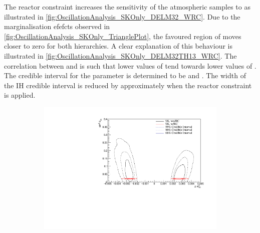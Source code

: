 The reactor constraint increases the sensitivity of the atmospheric samples to \delmsqatm as illustrated in \autoref{fig:OscillationAnalysis_SKOnly_DELM32_WRC}. Due to the marginalisation efefcts observed in \autoref{fig:OscillationAnalysis_SKOnly_TrianglePlot}, the favoured region of \delmsqatm moves closer to zero for both hierarchies. A clear explanation of this behaviour is illustrated in \autoref{fig:OscillationAnalysis_SKOnly_DELM32TH13_WRC}. The correlation between \delmsqatm and \sinsqreac is such that lower values of \sinsqreac tend towards lower values of . The \quickmath{1\sigma} credible interval for the \delmsqatm parameter is determined to be  and . The width of the IH credible interval is reduced by approximately  when the reactor constraint is applied.

\begin{figure}[h]
  \begin{subfigure}[t]{1.0\textwidth}
    \includegraphics[width=\textwidth, trim={0mm 0mm 0mm 0mm}, clip,page=1]{Figures/OA/SKOnlyFit_wRC/ContourComparison_2D_dm32_th13_BH_0_wRC_woRC_UnSmeared_CredibleInterval.pdf}
  \end{subfigure}
  \caption{}
  \label{fig:OscillationAnalysis_SKOnly_DELM32TH13_WRC}
\end{figure}

